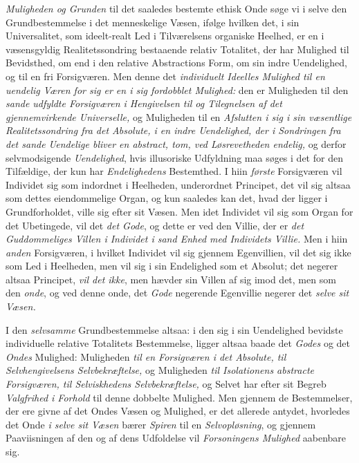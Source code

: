 \emph{Muligheden og Grunden} til det saaledes bestemte ethisk Onde søge vi i
selve den Grundbestemmelse i det menneskelige Væsen, ifølge hvilken det, i sin
Universalitet, som ideelt-realt Led i Tilværelsens organiske Heelhed, er en i
væsensgyldig Realitetssondring bestaaende relativ Totalitet, der har Mulighed til
Bevidsthed, om end i den relative Abstractions Form, om sin indre Uendelighed, og
til en fri Forsigværen. Men denne det \emph{individuelt Ideelles Mulighed til en
uendelig Væren for sig er en i sig fordobblet Mulighed:} den er Muligheden til
den \emph{sande udfyldte Forsigværen i Hengivelsen til og Tilegnelsen af det
gjennemvirkende Universelle,} og Muligheden til en \emph{Afslutten i sig i sin
væsentlige Realitetssondring fra det Absolute, i en indre Uendelighed, der i
Sondringen fra det sande Uendelige bliver en abstract, tom, ved Løsrevetheden
endelig,} og derfor selvmodsigende \emph{Uendelighed}, hvis illusoriske
Udfyldning maa søges i det for den Tilfældige, der kun har \emph{Endelighedens}
Bestemthed. I hiin \emph{første} Forsigværen vil Individet sig som indordnet i
Heelheden, underordnet Principet, det vil sig altsaa som dettes eiendommelige
Organ, og kun saaledes kan det, hvad der ligger i Grundforholdet, ville sig efter
sit Væsen. Men idet
 Individet vil sig som Organ for det Ubetingede, vil det \emph{det Gode}, og dette
er ved den Villie, der er \emph{det Guddommeliges Villen i Individet i sand Enhed
med Individets Villie.} Men i hiin \emph{anden} Forsigværen, i hvilket Individet
vil sig gjennem Egenvillien, vil det sig ikke som Led i Heelheden, men vil sig i
sin Endelighed som et Absolut; det negerer altsaa Principet, \emph{vil det ikke},
men hævder sin Villen af sig imod det, men som den \emph{onde}, og ved denne
onde, det \emph{Gode} negerende Egenvillie negerer det \emph{selve sit Væsen.}

I den \emph{selvsamme} Grundbestemmelse altsaa: i den sig i sin Uendelighed
bevidste individuelle relative Totalitets Bestemmelse, ligger altsaa baade det
\emph{Godes} og det \emph{Ondes} Mulighed: Muligheden \emph{til en Forsigværen i
det Absolute, til Selvhengivelsens Selvbekræftelse,} og Muligheden \emph{til
Isolationens abstracte Forsigværen, til Selviskhedens Selvbekræftelse,} og Selvet
har efter sit Begreb \emph{Valgfrihed i Forhold} til denne dobbelte Mulighed. Men
gjennem de Bestemmelser, der ere givne af det Ondes Væsen og Mulighed, er det
allerede antydet, hvorledes det Onde \emph{i selve sit Væsen} bærer \emph{Spiren}
til en \emph{Selvopløsning}, og gjennem Paaviisningen af den og af dens
Udfoldelse vil \emph{Forsoningens Mulighed} aabenbare sig.

